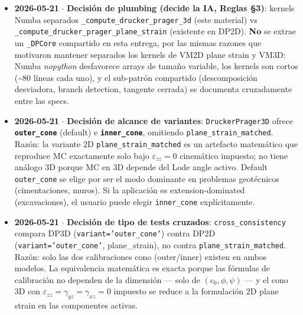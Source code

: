 \documentclass[11pt,letterpaper,oneside]{report}
\begin{document}
\begin{itemize}
  \item \textbf{2026-05-21} \ensuremath{\cdot} \textbf{Decisión de plumbing (decide la IA, Reglas §3)}: kernels Numba separados \texttt{\_compute\_drucker\_prager\_3d} (este material) vs \texttt{\_compute\_drucker\_prager\_plane\_strain} (existente en DP2D). \textbf{No} se extrae un \texttt{\_DPCore} compartido en esta entrega, por las mismas razones que motivaron mantener separados los kernels de VM2D plane strain y VM3D: Numba \textit{nopython} desfavorece arrays de tamaño variable, los kernels son cortos (\textasciitilde{}80 líneas cada uno), y el sub-patrón compartido (descomposición desviadora, branch detection, tangente cerrada) se documenta cruzadamente entre las specs.
\end{itemize}

\begin{itemize}
  \item \textbf{2026-05-21} \ensuremath{\cdot} \textbf{Decisión de alcance de variantes}: \texttt{DruckerPrager3D} ofrece \textbf{\texttt{outer\_cone}} (default) e \textbf{\texttt{inner\_cone}}, omitiendo \texttt{plane\_strain\_matched}. Razón: la variante 2D \texttt{plane\_strain\_matched} es un artefacto matemático que reproduce MC exactamente solo bajo $\varepsilon_{zz} = 0$ cinemático impuesto; no tiene análogo 3D porque MC en 3D depende del Lode angle activo. Default \texttt{outer\_cone} se elige por ser el modo dominante en problemas geotécnicos (cimentaciones, muros). Si la aplicación es extension-dominated (excavaciones), el usuario puede elegir \texttt{inner\_cone} explícitamente.
\end{itemize}

\begin{itemize}
  \item \textbf{2026-05-21} \ensuremath{\cdot} \textbf{Decisión de tipo de tests cruzados}: \texttt{cross\_consistency} compara DP3D (\texttt{variant='outer\_cone'}) contra DP2D (\texttt{variant='outer\_cone'}, plane\_strain), no contra \texttt{plane\_strain\_matched}. Razón: solo las dos calibraciones cono (outer/inner) existen en ambos modelos. La equivalencia matemática es exacta porque las fórmulas de calibración no dependen de la dimensión --- solo de $(c_0, \phi, \psi)$ --- y el cono 3D con $\varepsilon_{zz}=\gamma_{yz}=\gamma_{xz}=0$ impuesto se reduce a la formulación 2D plane strain en las componentes activas.
\end{itemize}
\end{document}
